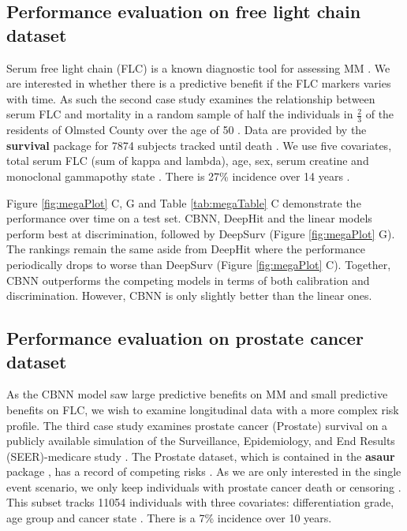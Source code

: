 \documentclass[APA,LATO1COL]{WileyNJD-v2}
\begin{document}
\hypertarget{pe-flc}{%
\subsection{Performance evaluation on free light chain dataset}\label{pe-flc}}
Serum free light chain (FLC) is a known diagnostic tool for assessing MM \citep{mm2flc}. We are interested in whether there is a predictive benefit if the FLC markers
varies with time. As such the second case study examines the relationship between serum FLC and mortality \citep{flc} in a random sample of half the individuals in
$\frac{2}{3}$ of the residents of Olmsted County over the age of 50 \citep{flc}. Data are provided by the \textbf{survival} package \citep{survpkg} for 7874 subjects tracked
until death \citep{flc}. We use five covariates, total serum FLC (sum of kappa and lambda), age, sex, serum creatine and monoclonal gammapothy state \citep{flc}. There is
27\% incidence over 14 years \citep{flc}.

Figure \ref{fig:megaPlot} C, G and Table \ref{tab:megaTable} C demonstrate the performance over time on a test set. CBNN, DeepHit and the linear models perform best at
discrimination, followed by DeepSurv (Figure \ref{fig:megaPlot} G). The rankings remain the same aside from DeepHit where the performance periodically drops to worse
than DeepSurv (Figure \ref{fig:megaPlot} C). Together, CBNN outperforms the competing models in terms of both calibration and discrimination.
However, CBNN is only slightly better than the linear ones.

\hypertarget{pe-prostate}{%
\subsection{Performance evaluation on prostate cancer dataset}\label{pe-prostate}}
As the CBNN model saw large predictive benefits on MM and small predictive benefits on FLC, we wish to examine longitudinal data with a more complex risk profile.
The third case study examines prostate cancer (Prostate) survival on a publicly available simulation of the Surveillance, Epidemiology, and End Results (SEER)-medicare study \citep{prostate}.
The Prostate dataset, which is contained in the \textbf{asaur} package \citep{asaur}, has a record of competing risks \citep{prostate}. As we are only interested in the single event scenario,
we only keep individuals with prostate cancer death or censoring \citep{prostate}. This subset tracks 11054 individuals with three covariates: differentiation grade, age group and cancer
state \citep{prostate}. There is a 7\% incidence over 10 years.
\end{document}
